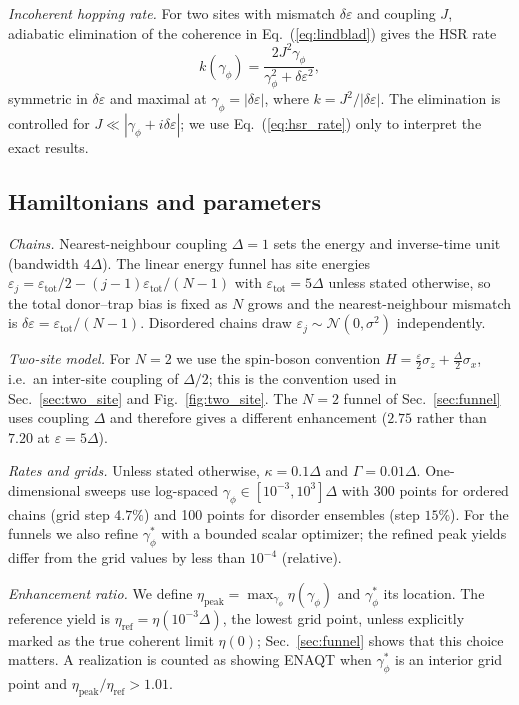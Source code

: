 \documentclass[aps,pre,preprint,floatfix]{revtex4-2}
\newcommand{\gp}{\gamma_\phi}
\newcommand{\gps}{\gamma_\phi^*}
\newcommand{\etap}{\eta_\text{peak}}
\newcommand{\etar}{\eta_\text{ref}}
\newcommand{\enh}{\etap/\etar}
\newcommand{\dE}{\delta\varepsilon}
\begin{document}
\textit{Incoherent hopping rate.}
For two sites with mismatch $\dE$ and coupling $J$, adiabatic elimination of
the coherence in Eq.~(\ref{eq:lindblad}) gives the HSR
rate~\cite{haken1973,moix2013}
\begin{equation}
  k(\gp) = \frac{2J^2\gp}{\gp^2+\dE^2},
  \label{eq:hsr_rate}
\end{equation}
symmetric in $\dE$ and maximal at $\gp=|\dE|$, where $k=J^2/|\dE|$.
The elimination is controlled for $J\ll|\gp+i\dE|$; we use
Eq.~(\ref{eq:hsr_rate}) only to interpret the exact results.

\subsection{Hamiltonians and parameters}

\textit{Chains.}
Nearest-neighbour coupling $\Delta=1$ sets the energy and inverse-time unit
(bandwidth $4\Delta$).
The linear energy funnel has site energies
$\varepsilon_j=\varepsilon_\text{tot}/2-(j-1)\varepsilon_\text{tot}/(N-1)$
with $\varepsilon_\text{tot}=5\Delta$ unless stated otherwise, so the total
donor--trap bias is fixed as $N$ grows and the nearest-neighbour mismatch is
$\dE=\varepsilon_\text{tot}/(N-1)$.
Disordered chains draw $\varepsilon_j\sim\mathcal{N}(0,\sigma^2)$
independently.

\textit{Two-site model.}
For $N=2$ we use the spin-boson convention
$H=\tfrac{\varepsilon}{2}\sigma_z+\tfrac{\Delta}{2}\sigma_x$, i.e.\ an
inter-site coupling of $\Delta/2$; this is the convention used in
Sec.~\ref{sec:two_site} and Fig.~\ref{fig:two_site}.
The $N=2$ funnel of Sec.~\ref{sec:funnel} uses coupling $\Delta$ and therefore
gives a different enhancement ($2.75$ rather than $7.20$ at
$\varepsilon=5\Delta$).

\textit{Rates and grids.}
Unless stated otherwise, $\kappa=0.1\Delta$ and $\Gamma=0.01\Delta$.
One-dimensional sweeps use log-spaced $\gp\in[10^{-3},10^{3}]\Delta$ with
300 points for ordered chains (grid step $4.7\%$) and 100 points for disorder
ensembles (step $15\%$).
For the funnels we also refine $\gps$ with a bounded scalar optimizer; the
refined peak yields differ from the grid values by less than $10^{-4}$
(relative).

\textit{Enhancement ratio.}
We define $\etap=\max_{\gp}\eta(\gp)$ and $\gps$ its location.
The reference yield is $\etar=\eta(10^{-3}\Delta)$, the lowest grid point,
unless explicitly marked as the true coherent limit $\eta(0)$;
Sec.~\ref{sec:funnel} shows that this choice matters.
A realization is counted as showing ENAQT when $\gps$ is an interior grid
point and $\enh>1.01$.
\end{document}
